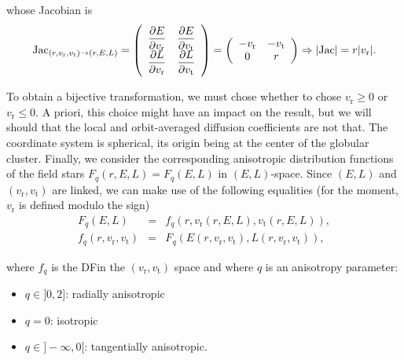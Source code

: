 \documentclass[11pt]{article}
\newcommand{\DF}{\ac{DF}}
\newcommand{\rt}{\mathrm{t}}
\newcommand{\rr}{\mathrm{r}}
\newcommand{\vr}{v_{\rr}}
\newcommand{\vt}{v_{\rt}}
\newcommand{\Fq}{F_{q}}
\newcommand{\fq}{f_{q}}
\begin{document}
whose Jacobian is
\begin{equation}
{\rm Jac}_{(r,\vr,\vt)\rightarrow(r,E,L)}=\left(\begin{array}{cc}
\displaystyle{\frac{\partial E}{\partial \vr}} & \displaystyle{\frac{\partial E}{\partial \vt}}\\
\displaystyle{\frac{\partial L}{\partial \vr}} & \displaystyle{\frac{\partial L}{\partial \vt}}
\end{array}\right)=\left(\begin{array}{cc}
-\vr & -\vt\\
0 & r
\end{array}\right)\Rightarrow|{\rm Jac}|=r|\vr| .
\label{eq:Jacobian}
  \end{equation}

To obtain a bijective transformation, we must chose whether to chose
$\vr\ge 0$ or $\vr\leq 0$. A priori, this choice might have an
impact on the result, but we will should that the local and orbit-averaged
diffusion coefficients are not that. The coordinate system is spherical,
its origin being at the center of the globular cluster. Finally, we
consider the corresponding anisotropic distribution functions of the
field stars $\Fq(r,E,L)= \Fq(E,L)$ in $(E,L)$-space. Since $(E,L)$
and $(\vr,\vt)$ are linked, we can make use of the following
equalities (for the moment, $\vr$ is defined modulo the sign)
\begin{equation}
\begin{array}{ccl}
\Fq(E,L) &=&\displaystyle{\fq(r,\vr(r,E,L),\vt(r,E,L))} ,\\
\fq(r,\vr,\vt)&=&\displaystyle{F_{q}(E(r,\vr,\vt),L(r,\vr,\vt))} ,
\end{array}
\label{eq:conversion_DF}
\end{equation}

where $\fq$ is the \DF in the $(\vr,\vt)$ space and where $q$ is an anisotropy
parameter:
\begin{itemize}
\item $q\in]0,2]$: radially anisotropic
\item $q=0$: isotropic
\item $q\in]-\infty,0[$: tangentially anisotropic.
\end{itemize}
\end{document}
